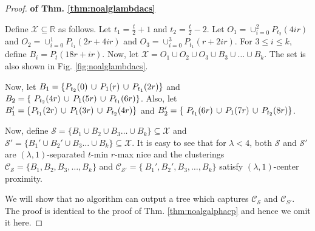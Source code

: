 \documentclass[anon,12pt]{colt2016} %
\newcommand{\mc}{\mathcal}
\begin{document}
\begin{proof}\textbf{ of Thm. \ref{thm:noalglambdacs}}

Define $\mc X \subseteq \mathbb{R}$ as follows. Let $t_1 = \frac{t}{2}+1$ and $t_2 = \frac{t}{2}-2$. Let $O_1 = \cup_{i=0}^2 P_{t_2}(4ir)$ and $O_2 = \cup_{i=0}^1 P_{t_1}(2r+4ir)$ and $O_3 = \cup_{i=0}^3 P_{t_1}(r+2ir)$. For $3\le i\le k$, define $B_i = P_t(18r+ir)$. Now, let $\mc X = O_1 \cup O_2 \cup O_3 \cup B_3 \cup \ldots \cup B_k$. The set is also shown in Fig. \ref{fig:noalglambdacs}.

Now, let $B_1 = \{P_{t_2}(0) \thinspace\cup\thinspace  P_{1}(r) \thinspace\cup\thinspace P_{t_1}(2r) \}$ and $B_2 = \{\ P_{t_2}(4r) \thinspace\cup\thinspace P_{1}(5r)\thinspace\cup\thinspace P_{t_1}(6r)\}$. Also, let $B_1' = \{P_{t_1}(2r) \thinspace\cup\thinspace  P_{1}(3r) \thinspace\cup\thinspace P_{t_2}(4r) \}$ and $B_2' = \{\ P_{t_1}(6r) \thinspace\cup\thinspace P_{1}(7r)\thinspace\cup\thinspace P_{t_2}(8r)\}$.

Now, define $\mc S = \{B_1 \cup B_2 \cup B_3\ldots \cup B_k\} \subseteq \mc X$ and $\mc S' = \{B_1' \cup B_2' \cup B_3\ldots \cup B_k\} \subseteq \mc X$. It is easy to see that for $\lambda < 4$, both $\mc S$ and $\mc S'$ are $(\lambda, 1)$-separated $t$-min $r$-max nice and the clusterings $\mc C_{\mc S} = \{B_1, B_2, B_3, \ldots, B_k\}$ and $\mc C_{\mc S'} = \{\ B_1', B_2', B_3, \ldots, B_k\}$ satisfy $(\lambda, 1)$-center proximity. 

We will show that no algorithm can output a tree which captures $\mc C_{\mc S}$ and $\mc C_{S'}$. The proof is identical to the proof of Thm. \ref{thm:noalgalphacp} and hence we omit it here.
\end{proof}
\end{document}
